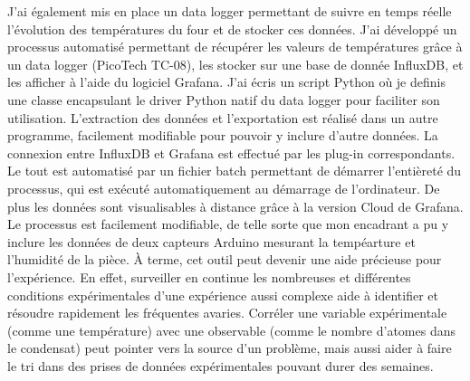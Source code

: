 \documentclass[12pt, a4paper]{article}
\begin{document}
J'ai également mis en place un data logger permettant de suivre en temps réelle l'évolution des températures du four et de stocker ces données. J'ai développé un processus automatisé permettant de récupérer les valeurs de températures grâce à un data logger (PicoTech TC-08), les stocker sur une base de donnée InfluxDB, et les afficher à l'aide du logiciel Grafana. J'ai écris un script Python où je definis une classe encapsulant le driver Python natif du data logger pour faciliter son utilisation. L'extraction des données et l'exportation est réalisé dans un autre programme, facilement modifiable pour pouvoir y inclure d'autre données. La connexion entre InfluxDB et Grafana est effectué par les plug-in correspondants. Le tout est automatisé par un fichier batch permettant de démarrer l'entièreté du processus, qui est exécuté automatiquement au démarrage de l'ordinateur. De plus les données sont visualisables à distance grâce à la version Cloud de Grafana. Le processus est facilement modifiable, de telle sorte que mon encadrant a pu y inclure les données de deux capteurs Arduino mesurant la tempéarture et l'humidité de la pièce. À terme, cet outil peut devenir une aide précieuse pour l'expérience. En effet, surveiller en continue les nombreuses et différentes conditions expérimentales d'une expérience aussi complexe aide à identifier et résoudre rapidement les fréquentes avaries. Corréler une variable expérimentale (comme une température) avec une observable (comme le nombre d'atomes dans le condensat) peut pointer vers la source d'un problème, mais aussi aider à faire le tri dans des prises de données expérimentales pouvant durer des semaines.

\newpage



\end{document}
